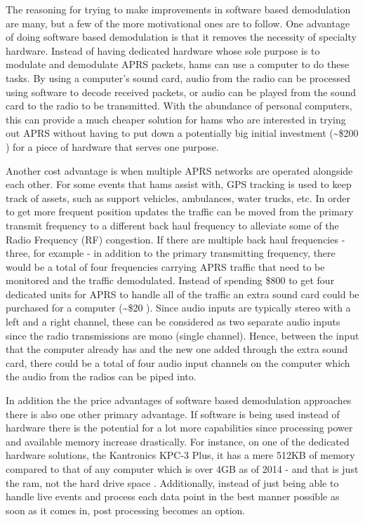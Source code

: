The reasoning for trying to make improvements in software based demodulation are many, but a few of the more motivational ones are to follow. One advantage of doing software based demodulation is that it removes the necessity of specialty hardware. Instead of having dedicated hardware whose sole purpose is to modulate and demodulate APRS packets, hams can use a computer to do these tasks. By using a computer's sound card, audio from the radio can be processed using software to decode received packets, or audio can be played from the sound card to the radio to be transmitted. With the abundance of personal computers, this can provide a much cheaper solution for hams who are interested in trying out APRS without having to put down a potentially big initial investment (\textasciitilde\$200 \cite{Kantronics2014,Outlet2014}) for a piece of hardware that serves one purpose.

Another cost advantage is when multiple APRS networks are operated alongside each other. For some events that hams assist with, GPS tracking is used to keep track of assets, such as support vehicles, ambulances, water trucks, etc. In order to get more frequent position updates the traffic can be moved from the primary transmit frequency to a different back haul frequency to alleviate some of the Radio Frequency (RF) congestion. If there are multiple back haul frequencies - three, for example - in addition to the primary transmitting frequency, there would be a total of four frequencies carrying APRS traffic that need to be monitored and the traffic demodulated. Instead of spending \$800 to get four dedicated units for APRS to handle all of the traffic an extra sound card could be purchased for a computer (\textasciitilde\$20 \cite{Newegg}). Since audio inputs are typically stereo with a left and a right channel, these can be considered as two separate audio inputs since the radio transmissions are mono (single channel). Hence, between the input that the computer already has and the new one added through the extra sound card, there could be a total of four audio input channels on the computer which the audio from the radios can be piped into.

In addition the the price advantages of software based demodulation approaches there is also one other primary advantage. If software is being used instead of hardware there is the potential for a lot more capabilities since processing power and available memory increase drastically. For instance, on one of the dedicated hardware solutions, the Kantronics KPC-3 Plus, it has a mere 512KB of memory compared to that of any computer which is over 4GB as of 2014 - and that is just the ram, not the hard drive space \cite{Kantronics2014,Graham-Smith2014}. Additionally, instead of just being able to handle live events and process each data point in the best manner possible as soon as it comes in, post processing becomes an option.


